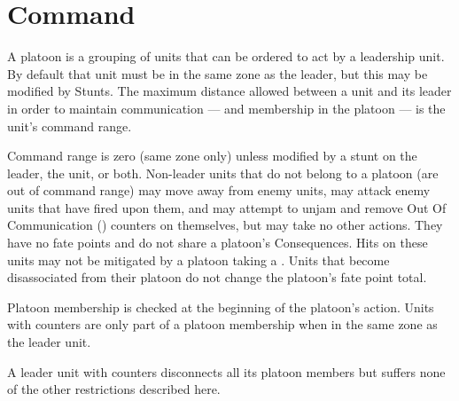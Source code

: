\section{Command}\label{sec:Command}

A platoon is a grouping of units that can be ordered to act by a leadership unit. By default that unit must be in the same zone as the leader, but this may be modified by Stunts. The maximum distance allowed between a unit and its leader in order to maintain communication --- and membership in the platoon --- is the unit's command range.

Command range is zero (same zone only) unless modified by a stunt on the leader, the unit, or both. Non-leader units that do not belong to a platoon (are out of command range) may move away from enemy units, may attack enemy units that have fired upon them, and may attempt to unjam and remove Out Of Communication (\OOC) counters on themselves, but may take no other actions. They have no fate points and do not share a platoon's Consequences. Hits on these units may not be mitigated by a platoon taking a \Consequence. Units that become disassociated from their platoon do not change the platoon's fate point total.

Platoon membership is checked at the beginning of the platoon's action. Units with \OOC{} counters are only part of a platoon membership when in the same zone as the leader unit.

A leader unit with \OOC{} counters disconnects all its platoon members but suffers none of the other restrictions described here.

